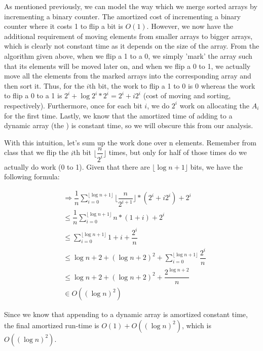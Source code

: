 \documentclass{article}
\newcommand\floor[1]{\lfloor#1\rfloor}
\begin{document}
As mentioned previously, we can model the way which we merge sorted arrays by incrementing a binary counter. The
amortized cost of incrementing a binary counter where it costs 1 to flip a bit is $O(1)$. However, we now have the
additional requirement of moving elements from smaller arrays to bigger arrays, which is clearly not constant
time as it depends on the size of the array. From the algorithm given above, when we flip a 1 to a 0, we
simply 'mark' the array such that its elements will be moved later on, and when we flip a 0 to 1, we actually
move all the elements from the marked arrays into the corresponding array and then sort it.
Thus, for the $i$th bit, the work to flip a 1 to 0 is 0 whereas the work to flip a 0 to a 1 is
$2^i + \log 2^i * 2^i = 2^i + i2^i$ (cost of moving and sorting, respectively). Furthermore, once for each bit $i$, we do $2^i$ work on allocating the
$A_i$ for the first time. Lastly, we know that the amortized time of adding to a dynamic array (the )
is constant time, so we will obscure this from our analysis.

With this intuition, let's sum up the work done over n elements. Remember from class that we flip the
$i$th bit $\floor{\dfrac{n}{2^i}}$ times, but only for half of those times do we actually do work (0 to 1).
Given that there are $\floor{\log n + 1}$ bits, we have the following formula:

\begin{align*}
    & \Rightarrow \dfrac{1}{n} \sum\limits_{i=0}^{ \floor{\log n + 1} } \floor{\dfrac{n}{2^{i+1}}} * (2^{i} + i2^i) +
    2^i \\
    & \leq \dfrac{1}{n} \sum\limits_{i=0}^{ \floor{\log n + 1} } n * (1 + i) + 2^i \\
    & \leq  \sum\limits_{i=0}^{ \floor{\log n + 1} } 1 + i + \dfrac{2^i}{n} \\
    & \leq  \log n + 2 + (\log n + 2)^2 + \sum\limits_{i=0}^{ \floor{\log n + 1} } \dfrac{2^i}{n} \\
    & \leq  \log n + 2 + (\log n + 2)^2 + \dfrac{2^{\log n + 2}}{n} \\
    & \in O((\log n)^2)
\end{align*}

Since we know that appending to a dynamic array is amortized constant time, the final amortized run-time is
$O(1) + O((\log n)^2)$, which is $O((\log n)^2)$.
\end{document}
